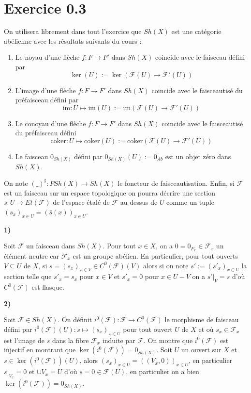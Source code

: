 \documentclass[a4paper,12pt]{article}
\newcommand{\F}{\mathscr F}
\newcommand{\im}{\textrm{im}}
\newcommand{\coker}{\textrm{coker}}
\theoremstyle{plain}
\theoremstyle{definition}
\theoremstyle{remark}
\begin{document}
\section*{Exercice 0.3}
On utilisera librement dans tout l'exercice que $Sh(X)$ est une
catégorie abélienne avec les résultats suivants du cours : 
\begin{enumerate}
	\item Le noyau d'une flèche $f\colon F\to F'$ dans $Sh(X)$
		coincide avec le faisceau défini par 
		\[\ker(U):=\ker(\F(U)\to\F'(U))\]
	\item L'image d'une flèche $f\colon F\to F'$ dans $Sh(X)$
		coincide avec le faisceautisé du préfaisceau défini
		par
		\[\im\colon U\mapsto \im(U):=\im(\F(U)\to\F'(U))\]
	\item Le conoyau d'une flèche $f\colon F\to F'$ dans $Sh(X)$
		coincide avec le faisceautisé du préfaisceau défini
		\[\coker\colon U\mapsto \coker(U):=\coker(\F(U)\to\F'(U))\]
	\item Le faisceau $0_{Sh(X)}$ défini par $0_{Sh(X)}(U):= 0_{Ab}$
		est un objet zéro dans $Sh(X)$.
\end{enumerate}
On note $(\_)^\sharp\colon PSh(X)\to Sh(X)$ le foncteur de 
faisceautisation. Enfin, si $\F$ est un faisceau sur un espace 
topologique on pourra décrire une section $\bar s\colon U\to Et(\F)$ 
de l'espace étalé de $\F$ au dessus de $U$ comme un tuple 
$(s_x)_{x\in U}=(\bar s(x))_{x\in U}$.

\begin{center}
	\textbf{1)}
\end{center}
Soit $\F$ un faisceau dans $Sh(X)$. Pour tout $x\in X$, on a 
$0=0_{F_x}\in \F_x$ un élément neutre car
$\F_x$ est un groupe abélien. En particulier, pour tout ouverts 
$V\subseteq U$ de $X$, si $s=(s_x)_{x\in V}\in C^0(\F)(V)$ alors
si on note $s':=(s'_x)_{x\in U}$ la section telle que $s'_x=s_x$ pour
$x\in V$ et $s'_x=0$ pour $x\in U-V$ on a $s'|_V=s$ d'où $C^0(\F)$
est flasque.

\begin{center}
	\textbf{2)}
\end{center}
Soit $\F\in Sh(X)$. On définit $i^0(\F)\colon \F\to C^0(\F)$ le
morphisme de faisceau défini par 
$i^0(\F)(U)\colon s\mapsto (s_x)_{x\in U}$ pour tout ouvert $U$ de $X$
et où $s_x\in \F_x$ est 
l'image de $s$ dans la fibre $\F_x$ induite par $\F$. On montre que
$i^0(\F)$ est injectif en montrant que $\ker(i^0(\F))=0_{Sh(X)}$. 
Soit $U$ un ouvert sur $X$ et $s\in \ker(i^0(\F))(U)$, alors 
$(s_x)_{x\in U}=((V_x, 0))_{x\in U}$, en particulier $s|_{V_x}=0$ 
et $\cup V_x = U$ d'où $s=0\in \F(U)$, en particulier on a bien 
$\ker(i^0(\F))=0_{Sh(X)}$.
\end{document}
